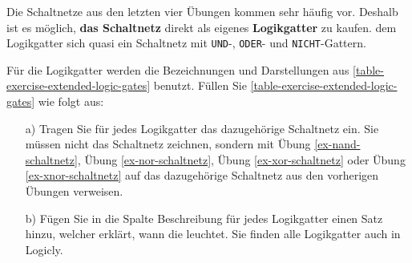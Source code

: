 \begin{exercise}\label{exercise-xor-nor-nand-xnor}
Die Schaltnetze aus den letzten vier Übungen kommen sehr häufig vor. Deshalb ist es möglich, \textbf{das Schaltnetz} direkt als eigenes \textbf{Logikgatter} zu kaufen.  dem Logikgatter  sich quasi ein Schaltnetz mit \texttt{UND}-, \texttt{ODER}- und \texttt{NICHT}-Gattern. 

Für die Logikgatter werden die Bezeichnungen und Darstellungen aus \autoref{table-exercise-extended-logic-gates} benutzt. Füllen Sie \autoref{table-exercise-extended-logic-gates} wie folgt aus:

\begin{enumerate}
\item[a)] Tragen Sie für jedes Logikgatter das dazugehörige Schaltnetz ein. Sie müssen nicht das Schaltnetz zeichnen, sondern mit Übung \ref{ex-nand-schaltnetz}, Übung \ref{ex-nor-schaltnetz}, Übung \ref{ex-xor-schaltnetz} oder Übung \ref{ex-xnor-schaltnetz} auf das dazugehörige Schaltnetz aus den vorherigen Übungen verweisen.

\item[b)] Fügen Sie in die Spalte Beschreibung für jedes Logikgatter einen Satz hinzu, welcher erklärt, wann die  leuchtet. Sie finden alle Logikgatter auch in Logicly.
\end{enumerate}


\end{exercise}
